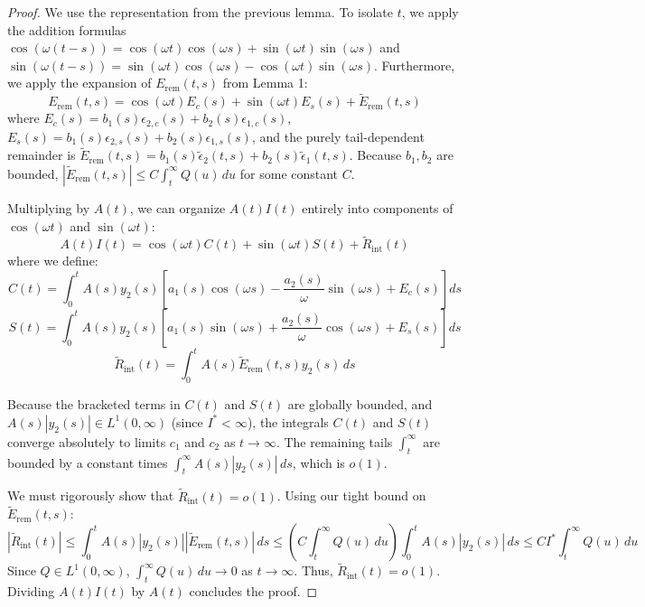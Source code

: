 \documentclass[10pt,reqno]{amsart}
\theoremstyle{definition}
\begin{document}
	\begin{proof}
		We use the representation from the previous lemma. To isolate $t$, we apply the addition formulas $\cos(\omega(t-s)) = \cos(\omega t)\cos(\omega s) + \sin(\omega t)\sin(\omega s)$ and $\sin(\omega(t-s)) = \sin(\omega t)\cos(\omega s) - \cos(\omega t)\sin(\omega s)$. 
		Furthermore, we apply the expansion of $E_{\text{rem}}(t,s)$ from Lemma 1:
		\[ E_{\text{rem}}(t,s) = \cos(\omega t)E_c(s) + \sin(\omega t)E_s(s) + \tilde{E}_{\text{rem}}(t,s) \]
		where $E_c(s) = b_1(s)\epsilon_{2,c}(s) + b_2(s)\epsilon_{1,c}(s)$, $E_s(s) = b_1(s)\epsilon_{2,s}(s) + b_2(s)\epsilon_{1,s}(s)$, and the purely tail-dependent remainder is $\tilde{E}_{\text{rem}}(t,s) = b_1(s)\tilde{\epsilon}_2(t,s) + b_2(s)\tilde{\epsilon}_1(t,s)$. Because $b_1, b_2$ are bounded, $|\tilde{E}_{\text{rem}}(t,s)| \leq C \int_t^\infty Q(u)\,du$ for some constant $C$.
		
		Multiplying by $A(t)$, we can organize $A(t)I(t)$ entirely into components of $\cos(\omega t)$ and $\sin(\omega t)$:
		\[ A(t)I(t) = \cos(\omega t)C(t) + \sin(\omega t)S(t) + \tilde{R}_{\text{int}}(t) \]
		where we define:
		\[ C(t) = \int_0^t A(s)y_2(s)\left[ a_1(s)\cos(\omega s) - \frac{a_2(s)}{\omega}\sin(\omega s) + E_c(s) \right] ds \]
		\[ S(t) = \int_0^t A(s)y_2(s)\left[ a_1(s)\sin(\omega s) + \frac{a_2(s)}{\omega}\cos(\omega s) + E_s(s) \right] ds \]
		\[ \tilde{R}_{\text{int}}(t) = \int_0^t A(s)\tilde{E}_{\text{rem}}(t,s)y_2(s)\,ds \]
		
		Because the bracketed terms in $C(t)$ and $S(t)$ are globally bounded, and $A(s)|y_2(s)| \in L^1(0, \infty)$ (since $I^* < \infty$), the integrals $C(t)$ and $S(t)$ converge absolutely to limits $c_1$ and $c_2$ as $t \to \infty$. The remaining tails $\int_t^\infty$ are bounded by a constant times $\int_t^\infty A(s)|y_2(s)|\,ds$, which is $o(1)$. 
		
		We must rigorously show that $\tilde{R}_{\text{int}}(t) = o(1)$. Using our tight bound on $\tilde{E}_{\text{rem}}(t,s)$:
		\[ |\tilde{R}_{\text{int}}(t)| \leq \int_0^t A(s)|y_2(s)| |\tilde{E}_{\text{rem}}(t,s)| \, ds \leq \left( C \int_t^\infty Q(u)\,du \right) \int_0^t A(s)|y_2(s)| \, ds \leq C I^* \int_t^\infty Q(u)\,du \]
		Since $Q \in L^1(0, \infty)$, $\int_t^\infty Q(u)\,du \to 0$ as $t \to \infty$. Thus, $\tilde{R}_{\text{int}}(t) = o(1)$. Dividing $A(t)I(t)$ by $A(t)$ concludes the proof.
	\end{proof}
	
	\vspace{0.5cm}
	
\end{document}
